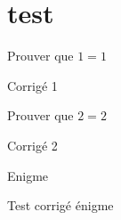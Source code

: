 \documentclass[nocrop]{sesamanuel}
\begin{document}
\themaG
\chapter{test}


\exercicesbase

\begin{colonne*exercice}

  \begin{exercice*}[Exercice 1]
  Prouver que $1=1$
  \end{exercice*}
  
  \begin{corrige}
  Corrigé 1
  \end{corrige}
  
  \begin{exercice*}[Exercice 2]
  Prouver que $2=2$
  \end{exercice*}
  
  \begin{corrige}
  Corrigé 2
  \end{corrige}
 

\end{colonne*exercice}

\Recreation

\begin{enigme}
  Enigme
\end{enigme}

\begin{corrige}
   Test corrigé énigme
\end{corrige}

\AfficheCorriges[2]
\end{document}
